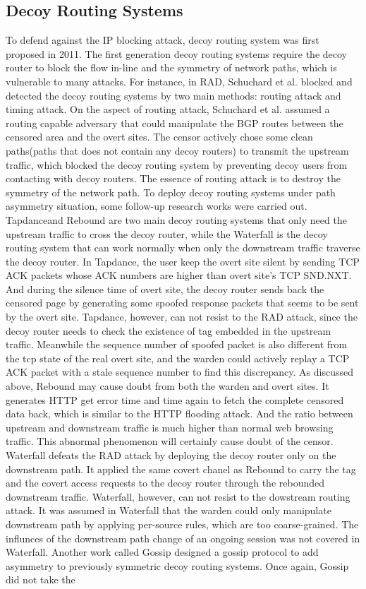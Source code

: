 \documentclass[conference]{IEEEtran}
\begin{document}
\subsection{Decoy Routing Systems}
To defend against the IP blocking attack, decoy routing system was first proposed in 2011\cite{cirripede}\cite{telex}\cite{curveball}. The first generation decoy routing systems require the decoy router to block the flow in-line and the symmetry of network paths, which is vulnerable to many attacks. For instance, in RAD\cite{rad}, Schuchard et al. blocked and detected the decoy routing systems by two main methods: routing attack and timing attack. On the aspect of routing attack, Schuchard et al. assumed a routing capable adversary that could manipulate the BGP routes between the censored area and the overt sites. The censor actively chose some clean paths(paths that does not contain any decoy routers) to transmit the upstream traffic, which blocked the decoy routing system by preventing decoy users from contacting with decoy routers.  The essence of routing attack is to destroy the symmetry of the network path. To deploy decoy routing systems under path asymmetry situation, some follow-up research works were carried out. Tapdance\cite{tapdance}and Rebound\cite{rebound} are two main decoy routing systems that only need the upstream traffic to cross the decoy router, while the Waterfall\cite{warterfall} is the decoy routing system that can work normally when only the downstream traffic traverse the decoy router. In Tapdance, the user keep the overt site silent by sending TCP ACK packets whose ACK numbers are higher than overt site’s TCP SND.NXT. And during the silence time of overt site, the decoy router sends back the censored page by generating some spoofed response packets that seems to be sent by the overt site. Tapdance, however, can not resist to the RAD attack, since the decoy router needs to check the existence of tag embedded in the upstream traffic. Meanwhile the sequence number of spoofed packet is also different from the tcp state of the real overt site, and the warden could actively replay a TCP ACK packet with a stale sequence number to find this discrepancy. As discussed above, Rebound may cause doubt from both the warden and overt sites. It generates HTTP get error time and time again to fetch the complete censored data back, which is similar to the HTTP flooding attack. And the ratio between upstream and downstream traffic is much higher than normal web browsing traffic. This abnormal phenomenon will certainly cause doubt of the censor. Waterfall\cite{warterfall} defeats the RAD attack by deploying the decoy router only on the downstream path. It applied the same covert chanel as Rebound to carry the tag and the covert access requests to the decoy router through the rebounded downstream traffic. Waterfall, however, can not resist to the dowstream routing attack. It was assumed in Waterfall that the warden could only manipulate downstream path by applying per-source rules, which are too coarse-grained. The influnces of the downstream path change of an ongoing session was not covered in Waterfall. Another work called Gossip\cite{gossip} designed a gossip protocol to add asymmetry to previously symmetric decoy routing systems. Once again, Gossip did not take the 
\end{document}
